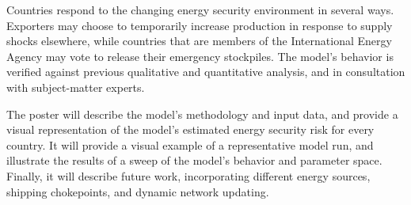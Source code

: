 \documentclass{llncs}
\begin{document}
Countries respond to the changing energy security environment in several ways. Exporters may choose to temporarily increase production in response to supply shocks elsewhere, while countries that are members of the International Energy Agency may vote to release their emergency stockpiles. The model's behavior is verified against previous qualitative and quantitative analysis, and in consultation with subject-matter experts. 

The poster will describe the model's methodology and input data, and provide a visual representation of the model's estimated energy security risk for every country. It will provide a visual example of a representative model run, and illustrate the results of a sweep of the model's behavior and parameter space. Finally, it will describe future work, incorporating different energy sources, shipping chokepoints, and dynamic network updating.



\end{document}
